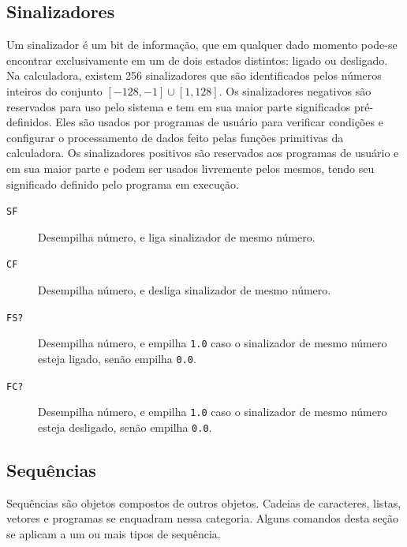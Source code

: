\documentclass[12pt,a4paper]{report}
\newcommand{\kwd}[1]{\texttt{\textcolor{keyword}{#1}}}
\newcommand{\SF}{\kwd{SF}} %
\newcommand{\CF}{\kwd{CF}} %
\newcommand{\FSQ}{\kwd{FS?}} %
\newcommand{\FCQ}{\kwd{FC?}} %
\numberwithin{theorem}{chapter}
\begin{document}
\subsection{Sinalizadores}

Um sinalizador é um bit de informação, que em qualquer dado momento
pode-se encontrar exclusivamente em um de dois estados distintos:
ligado ou desligado.  Na calculadora, existem 256 sinalizadores que
são identificados pelos números inteiros do conjunto \([-128, -1] \cup
[1, 128]\).  Os sinalizadores negativos são reservados para uso pelo
sistema e tem em sua maior parte significados pré-definidos.  Eles são
usados por programas de usuário para verificar condições e configurar
o processamento de dados feito pelas funções primitivas da
calculadora.  Os sinalizadores positivos são reservados aos programas
de usuário e em sua maior parte e podem ser usados livremente pelos
mesmos, tendo seu significado definido pelo programa em execução.

\begin{description}

  \item[\SF]\label{SF} Desempilha número, e liga sinalizador de mesmo
    número.

  \item[\CF]\label{CF} Desempilha número, e desliga sinalizador de
    mesmo número.

  \item[\FSQ]\label{FSQ} Desempilha número, e empilha \texttt{1.0} caso
    o sinalizador de mesmo número esteja ligado, senão empilha
    \texttt{0.0}.

  \item[\FCQ]\label{FCQ} Desempilha número, e empilha \texttt{1.0} caso
    o sinalizador de mesmo número esteja desligado, senão empilha
    \texttt{0.0}.

\end{description}

\subsection{Sequências}\label{sequencias}

Sequências são objetos compostos de outros objetos.  Cadeias de
caracteres, listas, vetores e programas se enquadram nessa categoria.
Alguns comandos desta seção se aplicam a um ou mais tipos de
sequência.
\end{document}
